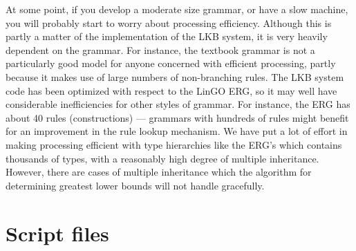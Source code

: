 \documentclass[12pt]{report}
\begin{document}
At some point, if you develop a moderate size grammar, or have a slow machine,
you will probably start to worry about processing efficiency.
Although this is partly a matter of the implementation of the LKB
system, it is very heavily dependent on the grammar.  For instance,
the textbook grammar is not a particularly
good model for anyone concerned with efficient processing, partly 
because it makes use
of large numbers of non-branching rules.
The LKB system code has been optimized with respect to the LinGO
ERG, so it may well have considerable inefficiencies for other
styles of grammar.  For instance, the ERG has about 40 rules (constructions)
--- grammars with hundreds of rules
might benefit for an improvement in the rule lookup mechanism.
We have put a lot of effort in making processing efficient
with type hierarchies like the ERG's
which contains thousands of types, with a reasonably
high degree of multiple inheritance.  However, there are
cases of multiple inheritance which the algorithm
for determining greatest lower bounds will not handle gracefully.

\section{Script files}
\label{script-adv}
\end{document}

